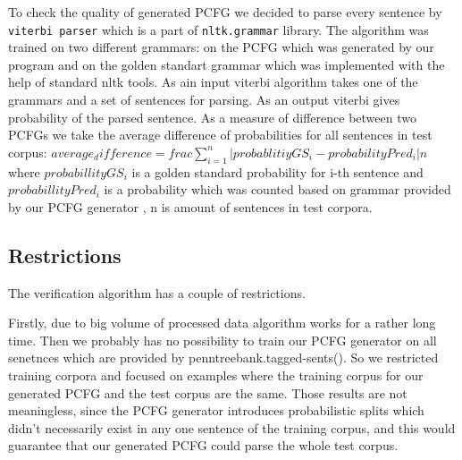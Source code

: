 \documentclass[paper=a4, fontsize=11pt]{scrartcl} %
\numberwithin{equation}{section} %
\numberwithin{figure}{section} %
\numberwithin{table}{section} %
\begin{document}
To check the quality of generated PCFG we decided to parse every sentence by \texttt{viterbi parser} which is a part of \texttt{nltk.grammar} library. The algorithm was trained on two different grammars: on the PCFG which was generated by our program and on the golden standart grammar which was implemented with the help of standard nltk tools. As ain input viterbi algorithm takes one of the grammars and a set of sentences for parsing. As an output viterbi gives probability of the parsed sentence. As a measure of difference between two PCFGs we take the average difference of probabilities for all sentences in test corpus: \begin{math} average_difference = frac{\sum \limits_{i=1}^n \lvert probablitiyGS_i - probabilityPred_i \rvert}{n} \end{math}  where  \begin{math} probabillityGS_i \end{math} is a golden standard probability for i-th sentence and \begin{math} probabillityPred_i \end{math} is a probability which was counted based on grammar provided by our PCFG generator , n is amount of sentences in test corpora.

\subsection{Restrictions}
The verification algorithm has a couple of restrictions. 

Firstly, due to big volume of processed data algorithm works for a rather long time. Then we probably has no possibility to train our PCFG generator on all senetnces which are provided by penntreebank.tagged-sents(). So we restricted training corpora and focused on examples where the training corpus for our generated PCFG and the test corpus are the same. Those results are not meaningless, since the PCFG generator introduces probabilistic splits which didn't necessarily exist in any one sentence of the training corpus, and this would guarantee that our generated PCFG could parse the whole test corpus. 
\end{document}
